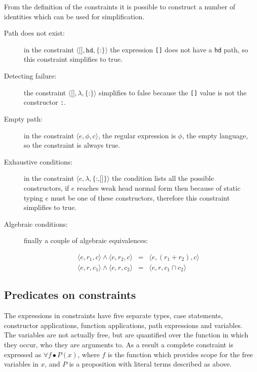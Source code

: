 \documentclass[preprint]{sigplanconf}
\newcommand{\T}[1]{\texttt{#1}}
\newcommand{\tup}[1]{\ensuremath{\langle #1 \rangle}}
\renewcommand{\c}[3]{\tup{\T{#1},\T{#2},\T{\{#3\}}}}
\newcommand{\cc}[2]{\c{#1}{$\lambda$}{#2}}
\begin{document}
From the definition of the constraints it is possible to construct a
number of identities which can be used for simplification.

\begin{description}

\item[Path does not exist:] in the constraint \c{[]}{hd}{:} the expression
\T{[]} does not have a \T{hd} path, so this constraint simplifies to
true.

\item[Detecting failure:] the constraint \cc{[]}{:} simplifies to false
because the \T{[]} value is not the constructor \T{:}.

\item[Empty path:] in the constraint $\tup{e,\phi,c}$, the
regular expression is $\phi$, the empty language, so the constraint
is always true.

\item[Exhaustive conditions:] in the constraint \cc{$e$}{:,[]}
the condition lists all the possible constructors, if $e$ reaches
weak head normal form then because of static typing $e$ must be one
of these constructors, therefore this constraint simplifies to true.

\item[Algebraic conditions:] finally a couple of algebraic equivalences:

\[
\begin{array}{rcl}
\tup{e,r_1,c} \wedge \tup{e,r_2,c} & = & \tup{e,(r_1+r_2),c} \\
\tup{e,r,c_1} \wedge \tup{e,r,c_2} & = & \tup{e,r,c_1 \cap c_2}
\end{array}
\]
\end{description}

\subsection{Predicates on constraints}

The expressions in constraints have five separate types, case statements,
constructor applications, function applications, path expressions and
variables. The variables are not actually free, but are quantified over the
function in which they occur, who they are arguments to. As a result a complete
constraint is expressed as $\forall f \bullet P(x)$, where $f$ is the function
which provides scope for the free variables in $x$, and $P$ is a proposition
with literal terms described as above.
\end{document}
